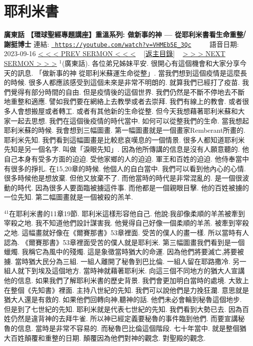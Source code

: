 \documentclass{book}
\begin{document}
\section{耶利米書}
\label{sec:VHMEb5E_3Qc}
\textbf{廣東話 【環球聖經專題講座】重溫系列: 做新事的神 — 從耶利米書看生命重整⧸謝挺博士}
\newline
\newline
連結: \href{https://youtube.com/watch?v=VHMEb5E_3Qc}{\texttt{ https://youtube.com/watch?v=VHMEb5E\_3Qc}} ~~~~ 語音日期: 2023-09-16 
\newline
\newline
\hyperref[sec:tuRWhEkvI_Q]{\small{< < < PREV SERMON < < <}}
~
\hyperref[sec:index]{\small{[返主目錄]}}
~
\hyperref[sec:Fxadxqj_2hA]{\small{> > > NEXT SERMON > > >}}
\newline
\newline
$^{1}$(廣東話).
各位弟兄姊妹平安.
很開心有這個機會和大家分享今天的訊息.
「做新事的神 從耶利米蘇運生命從整」.
當我們想到這個疫情是這麼長的時候.
很多人都應該感受到這個未來是非常不明朗的.
就算我們已經打了疫苗.
我們覺得有部分時間的自由.
但是疫情後的這個世界.
我們仍然是不斷不停地去不斷地重整和適應.
譬如我們要在網絡上去教學或者去崇拜.
我們有線上的教會.
或者很多人會想搬屋或者轉工.
或者有其他新的生命從整.
但今天我想藉著耶利米蘇和大家一起去思想.
我們在這個後疫情的時代當中.
如何可以從整我們的生命.
當我想起耶利米蘇的時候.
我會想到三幅圖畫.
第一幅圖畫就是一個畫家Remberant所畫的.
耶利米先知.
我們看到這幅圖畫是比較悲哀嘆息的一個情景.
很多人都知道耶利米先知是另一個名字.
叫做「淚眼先知」.
因為他所傳講的信息是沒有人願意聽的.
他自己本身有受多方面的迫迫.
受他家鄉的人的迫迫.
軍王和百姓的迫迫.
他侍奉當中有很多的掙扎.
在15,20章的時候.
他個人的自白當中.
我們可以看到他內心的心情.
很多時候他是想放棄.
但他又放棄不了.
而他當時的時代是非常混亂的.
是一個很波動的時代.
因為很多人要面臨被擄這件事.
而他都是一個親眼目擊.
他的百姓被擄的一位先知.
第二幅圖畫就是一個被殺的羔羊.

$^{41}$在耶利米書的11章19節.
耶利米這樣形容他自己.
他說:我卻像柔順的羊羔被牽到宰殺之地.
我不知道他們設計謀害我.
他覺得自己好像一個柔順的羊羔.
被牽到宰殺之地.
這幅畫就好像在《爾賽那書》53章裡面.
受苦的僕人的畫一樣.
所以當時有人認為.
《爾賽那書》53章裡面受苦的僕人就是耶利米.
第三幅圖畫我們看到是一個蠟燭.
我稱它為風中的殘燭.
這是象徵當時猶大的命運.
因為他們將要滅亡,將要被擄.
當時猶大民分為三組.
一組人離開了秘魯到巴比倫.
一組人留在耶路撒冷.
另一組人就下到埃及這個地方.
當時神就藉著耶利米.
向這三個不同地方的猶大人宣講他的信息.
如果我們了解耶利米書的歷史背景.
我們會更加明白當時的處境.
大致上在整個《先知書》裡面.
主持八世紀的先知.
我們可以說他們是力挽狂瀾.
意思就是猶大人還是有救的.
如果他們回轉向神,聽神的話.
他們未必會輪到秘魯這個地步.
但是到了七世紀的先知.
耶利米就是代表七世紀的先知.
我們看到大勢已去.
因為百姓仍然是違背神的去拜牛雀.
所以神已經定義要秘魯的事件臨到他們.
而要宣講秘魯的信息.
當時是非常不容易的.
而秘魯巴比倫這個階段.
七十年當中.
就是整個猶大百姓顛覆和重整的日期.
顛覆因為他們對神的觀念.
對聖殿的觀念.
\end{document}
